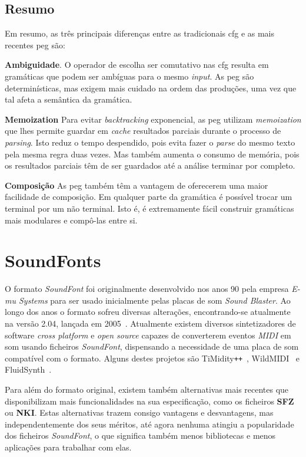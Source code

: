 
\subsection{Resumo}
Em resumo, as três principais diferenças entre as tradicionais \acrfull{cfg} e as mais recentes \acrfull{peg} são:

\textbf{Ambiguidade}. O operador de escolha ser comutativo nas \acrshort{cfg} resulta em gramáticas que podem ser ambíguas para o mesmo \textit{input}. As \acrshort{peg} são determinísticas, mas exigem mais cuidado na ordem das produções, uma vez que tal afeta a semântica da gramática.

\textbf{Memoization} Para evitar \textit{backtracking} exponencial, as \acrshort{peg} utilizam \textit{memoization} que lhes permite guardar em \textit{cache} resultados parciais durante o processo de \textit{parsing}. Isto reduz o tempo despendido, pois evita fazer o \textit{parse} do mesmo texto pela mesma regra duas vezes. Mas também aumenta o consumo de memória, pois os resultados parciais têm de ser guardados até a análise terminar por completo.

\textbf{Composição} As \acrlong{peg} também têm a vantagem de oferecerem uma maior facilidade de composição. Em qualquer parte da gramática é possível trocar um terminal por um não terminal. Isto é, é extremamente fácil construir gramáticas mais modulares e compô-las entre si.

\section{SoundFonts}
O formato \textit{SoundFont} foi originalmente desenvolvido nos anos 90 pela empresa \textit{E-mu Systems} para ser usado inicialmente pelas placas de som \textit{Sound Blaster}. Ao longo dos anos o formato sofreu diversas alterações, encontrando-se atualmente na versão 2.04, lançada em 2005~\citep{soundfont}. Atualmente existem diversos sintetizadores de software \textit{cross platform} e \textit{open source} capazes de converterem eventos \textit{MIDI} em som usando ficheiros \textit{SoundFont}, dispensando a necessidade de uma placa de som compatível com o formato. Alguns destes projetos são TiMidity\verb|++|~\citep{timidity}, WildMIDI~\citep{wild-midi} e FluidSynth~\citep{fluidsynth}.


Para além do formato original, existem também alternativas mais recentes que disponibilizam mais funcionalidades na sua especificação, como os ficheiros \textbf{SFZ} ou \textbf{NKI}. Estas alternativas trazem consigo vantagens e desvantagens, mas independentemente dos seus méritos, até agora nenhuma atingiu a popularidade dos ficheiros \textit{SoundFont}, o que significa também menos bibliotecas e menos aplicações para trabalhar com elas.

